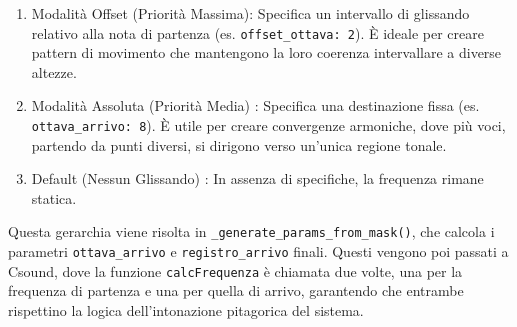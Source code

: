 \begin{enumerate}
    \item Modalità Offset (Priorità Massima): Specifica un intervallo di glissando relativo alla nota di partenza (es. \texttt{offset\_ottava: 2}). È ideale per creare pattern di movimento che mantengono la loro coerenza intervallare a diverse altezze.
    \item Modalità Assoluta (Priorità Media) : Specifica una destinazione fissa (es. \texttt{ottava\_arrivo: 8}). È utile per creare convergenze armoniche, dove più voci, partendo da punti diversi, si dirigono verso un'unica regione tonale.
    \item Default (Nessun Glissando) : In assenza di specifiche, la frequenza rimane statica.
\end{enumerate}
Questa gerarchia viene risolta in \texttt{\_generate\_params\_from\_mask()}, che calcola i parametri \texttt{ottava\_arrivo} e \texttt{registro\_arrivo} finali. Questi vengono poi passati a Csound, dove la funzione \texttt{calcFrequenza} è chiamata due volte, una per la frequenza di partenza e una per quella di arrivo, garantendo che entrambe rispettino la logica dell'intonazione pitagorica del sistema.